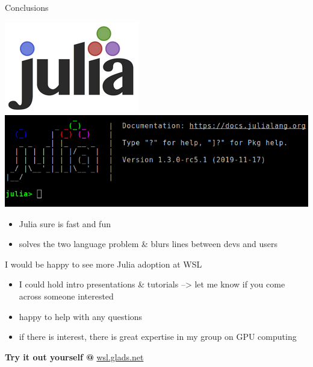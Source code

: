 \documentclass[compress,presentation,aspectratio=169]{beamer}
\begin{document}
\begin{frame}[label={sec:orge9a7aab}]{Conclusions}
  \begin{center}
\includegraphics[width=.2\linewidth]{./figs/julia-logo.png}\quad \includegraphics[width=.3\linewidth]{./figs/julia-repl.png}
\end{center}

  \footnotesize
\begin{itemize}
\item Julia sure is fast and fun
\item solves the two language problem \& blurs lines between devs and users
\end{itemize}
\vspace{5mm}

I would be happy to see more Julia adoption at WSL
\begin{itemize}
\item I could hold intro presentations \& tutorials
--> let me know if you come across someone interested
\item happy to help with any questions
\item if there is interest, there is great expertise in my group on
  GPU computing
\end{itemize}
\vspace{5mm}

\pause
\textbf{Try it out yourself @} \url{wsl.glads.net}
\end{frame}
\end{document}

